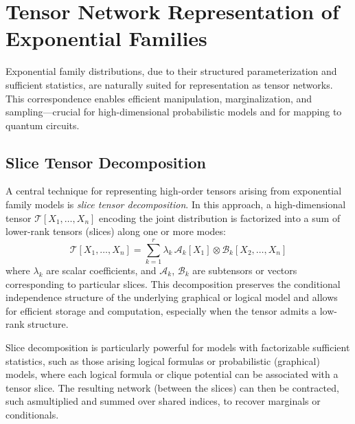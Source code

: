 \documentclass[encoding=utf8,british]{tumphthesis}
\begin{document}
	\section{Tensor Network Representation of Exponential Families}
	\label{sect:sect:Foundations_EXP2TN}
        Exponential family distributions, due to their structured parameterization and sufficient statistics, are naturally suited for 
        representation as tensor networks. This correspondence enables efficient manipulation, marginalization, and sampling—crucial for 
        high-dimensional probabilistic models and for mapping to quantum circuits.

		\subsection{Slice Tensor Decomposition}
		\label{subsect:Foundations_EXP2TN_slice}

		A central technique for representing high-order tensors arising from exponential family models is \textit{slice tensor decomposition}. 
        In this approach, a high-dimensional tensor $\mathcal{T}[X_1, \ldots, X_n]$ encoding the joint distribution is factorized into a sum 
        of lower-rank tensors (slices) along one or more modes:
		\begin{equation}
		    \mathcal{T}[X_1, \ldots, X_n] = \sum_{k=1}^r \lambda_k \, \mathcal{A}_k[X_1] \otimes \mathcal{B}_k[X_2, \ldots, X_n]
		\end{equation}
		where $\lambda_k$ are scalar coefficients, and $\mathcal{A}_k$, $\mathcal{B}_k$ are subtensors or vectors corresponding to particular 
        slices. This decomposition preserves the conditional independence structure of the underlying graphical or logical model and allows 
        for efficient storage and computation, especially when the tensor admits a low-rank structure.

		Slice decomposition is particularly powerful for models with factorizable sufficient statistics, such as those arising logical formulas 
        or probabilistic (graphical) models, where each logical formula or clique potential can be associated with a tensor slice. The resulting 
        network (between the slices) can then be contracted, such asmultiplied and summed over shared indices, to recover marginals or conditionals.
\end{document}
